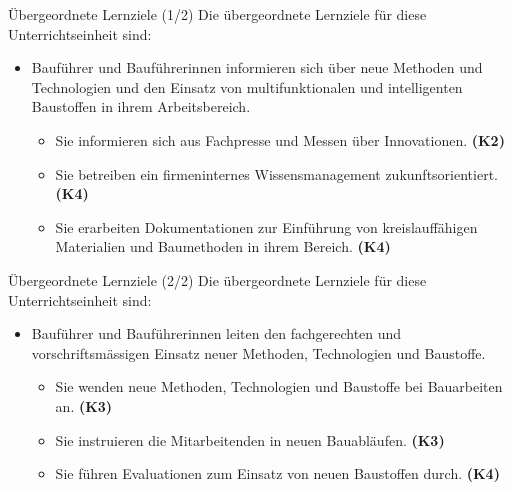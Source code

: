 \begin{frame}{Übergeordnete Lernziele (1/2)}
    Die übergeordnete Lernziele für diese Unterrichtseinheit sind: 
    \begin{itemize}
        \item[\textbullet]  Bauführer und Bauführerinnen informieren sich über neue Methoden und Technologien und den Einsatz von
        multifunktionalen und intelligenten Baustoffen in ihrem Arbeitsbereich.
        \begin{itemize}
            \item [\textbullet]  Sie informieren sich aus Fachpresse und Messen über Innovationen. \textbf{(K2)}
            \item [\textbullet] Sie betreiben ein firmeninternes Wissensmanagement zukunftsorientiert. \textbf{(K4)}
            \item [\textbullet] Sie erarbeiten Dokumentationen zur Einführung von kreislauffähigen Materialien und Baumethoden
            in ihrem Bereich. \textbf{(K4)}
        \end{itemize}
    \end{itemize}
\end{frame}

\begin{frame}{Übergeordnete Lernziele (2/2)}
    Die übergeordnete Lernziele für diese Unterrichtseinheit sind: 
    \begin{itemize}
        \item [\textbullet] Bauführer und Bauführerinnen leiten den fachgerechten und vorschriftsmässigen Einsatz neuer Methoden, Technologien und Baustoffe.
        \begin{itemize}
            \item[\textbullet]  Sie wenden neue Methoden, Technologien und Baustoffe bei Bauarbeiten an. \textbf{(K3)}
            \item [\textbullet] Sie instruieren die Mitarbeitenden in neuen Bauabläufen. \textbf{(K3)}
            \item [\textbullet] Sie führen Evaluationen zum Einsatz von neuen Baustoffen durch. \textbf{(K4)}
        \end{itemize}
    \end{itemize}
\end{frame}

